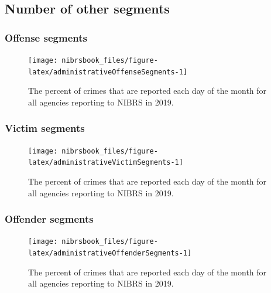 \documentclass[
  12pt,
  openany]{book}
\begin{document}
\hypertarget{number-of-other-segments}{%
\subsection{Number of other segments}\label{number-of-other-segments}}

\hypertarget{offense-segments}{%
\subsubsection{Offense segments}\label{offense-segments}}

\begin{figure}

{\centering \texttt{[image: nibrsbook\_files/figure-latex/administrativeOffenseSegments-1]} 

}

\caption{The percent of crimes that are reported each day of the month for all agencies reporting to NIBRS in 2019.}\label{fig:administrativeOffenseSegments}
\end{figure}

\hypertarget{victim-segments}{%
\subsubsection{Victim segments}\label{victim-segments}}

\begin{figure}

{\centering \texttt{[image: nibrsbook\_files/figure-latex/administrativeVictimSegments-1]} 

}

\caption{The percent of crimes that are reported each day of the month for all agencies reporting to NIBRS in 2019.}\label{fig:administrativeVictimSegments}
\end{figure}

\hypertarget{offender-segments}{%
\subsubsection{Offender segments}\label{offender-segments}}

\begin{figure}

{\centering \texttt{[image: nibrsbook\_files/figure-latex/administrativeOffenderSegments-1]} 

}

\caption{The percent of crimes that are reported each day of the month for all agencies reporting to NIBRS in 2019.}\label{fig:administrativeOffenderSegments}
\end{figure}
\end{document}
